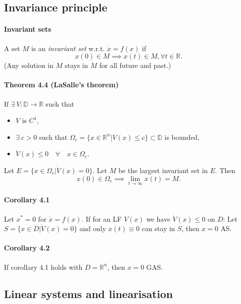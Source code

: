 \subsection{Invariance principle}
\paragraph{Invariant sets} A set $M$ is an \emph{invariant set} w.r.t. $\dot{x} = f(x)$ if
\begin{equation}
	x(0) \in M \implies x(t) \in M, \forall t \in \mathbb{R}.
\end{equation}
(Any solution in $M$ stays in $M$ for all future and past.)

\paragraph{Theorem 4.4 (LaSalle's theorem)}
If $\exists \: V : \mathbb{D} \to \mathbb{R}$ such that
\begin{itemize}
	\item $V$ is $C^1$,
	\item $\exists \: c > 0$ such that $\Omega_c = \{x \in \mathbb{R}^n | V(x) \leq c \} \subset \mathbb{D}$ is bounded,
	\item $\dot{V}(x) \leq 0 \quad \forall \quad x \in \Omega_c$.
\end{itemize}
Let $E = \{ x \in \Omega_c | \dot{V}(x) = 0 \}$. Let $M$ be the largest invariant set in $E$. Then
\begin{equation}
	x(0) \in \Omega_c \implies \lim_{t \to \infty} x(t) = M.
\end{equation}

\paragraph{Corollary 4.1} Let $x^* = 0$ for $\dot{x} = f(x)$. If for an LF $V(x)$ we have $\dot{V}(x) \leq 0$ on $D$: Let $S = \{ x \in D | \dot{V}(x) = 0 \}$ and only $x(t) \equiv 0$ can stay in $S$, then $x = 0$ AS.

\paragraph{Corollary 4.2} If corollary 4.1 holds with $D = \mathbb{R}^n$, then $x = 0$ GAS.

\subsection{Linear systems and linearisation}
